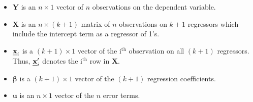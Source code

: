 \documentclass[a4paper,11pt]{article}
\def\mathbi#1{\textbf{\em #1}}
\begin{document}
\begin{itemize}
\item \(\mathbf{Y}\) is an \(n \times 1\) vector of \(n\) observations on the
dependent variable.
\item \(\mathbf{X}\) is an \(n \times (k+1)\) matrix of \(n\) observations on
\(k + 1\) regressors which include the intercept term as a regressor of
1's.
\item \(\mathbi{x}_i\) is a \((k+1) \times 1\) vector of the i\(^{\text{th}}\)
observation on all \((k+1)\) regressors. Thus,
\(\mathbi{x}^{\prime}_i\) denotes the i\(^{\text{th}}\) row in \(\mathbf{X}\).
\item \(\boldsymbol{\beta}\) is a \((k+1) \times 1\) vector of the \((k+1)\)
regression coefficients.
\item \(\mathbf{u}\) is an \(n \times 1\) vector of the \(n\) error terms.
\end{itemize}
\end{document}
